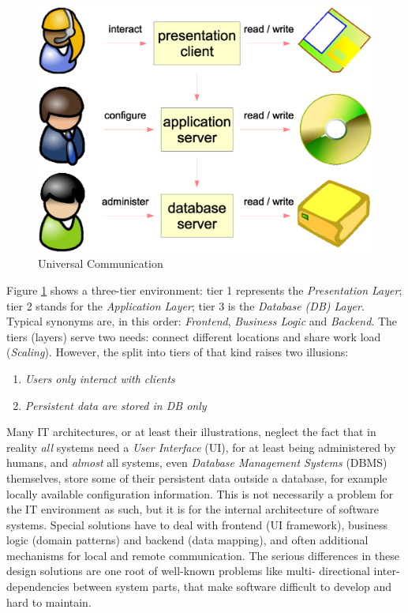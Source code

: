 \begin{figure}[ht]
    \begin{center}
        \includegraphics[scale=0.2]{vector/universal.eps}
        \caption{Universal Communication}
        \label{universal_figure}
    \end{center}
\end{figure}

Figure \ref{universal_figure} shows a three-tier environment: tier 1 represents
the \emph{Presentation Layer}; tier 2 stands for the \emph{Application Layer};
tier 3 is the \emph{Database (DB) Layer}. Typical synonyms are, in this order:
\emph{Frontend}, \emph{Business Logic} and \emph{Backend}. The tiers (layers)
serve two needs: connect different locations and share work load (\emph{Scaling}).
However, the split into tiers of that kind raises two illusions:

\begin{enumerate}
    \item \emph{Users only interact with clients}
    \item \emph{Persistent data are stored in DB only}
\end{enumerate}

Many IT architectures, or at least their illustrations, neglect the fact that
in reality \emph{all} systems need a \emph{User Interface} (UI), for at least
being administered by humans, and \emph{almost} all systems, even
\emph{Database Management Systems} (DBMS) themselves, store some of their
persistent data outside a database, for example locally available configuration
information. This is not necessarily a problem for the IT environment as such,
but it is for the internal architecture of software systems. Special solutions
have to deal with frontend (UI framework), business logic (domain patterns) and
backend (data mapping), and often additional mechanisms for local and remote
communication. The serious differences in these design solutions are one root
of well-known problems like multi- directional inter-dependencies between system
parts, that make software difficult to develop and hard to maintain.

